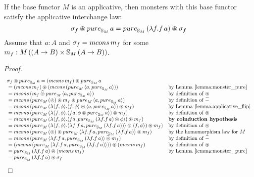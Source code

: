 \begin{lemma}
If the base functor $M$ is an applicative, then monsters with this base functor satisfy the applicative interchange law:
$$
\sigma_f \appl \apure_{\stream{M}}\,a = \apure_{\stream{M}}\,(\lambda f. f\,a) \appl \sigma_f
$$
Assume that $a:A$ and $\sigma_f = \mcons\,m_f$ for some $m_f:M\,((A\rightarrow B)\times \mathbb{S}_{M}\,(A\rightarrow B))$.
\end{lemma}
\begin{proof}
$$
\begin{array}{ll}
\sigma_f \appl \apure_{\stream{M}}\,a = (\mcons\,m_f) \appl \apure_{\stream{M}}\,a \\
{}= (\mcons\,m_f) \appl (\mcons\,(\apure_M\,\langle a, \apure_{\stream{M}}\,a\rangle))
  & \mbox{by Lemma \ref{lemma:monster_pure}}\\
{}= \mcons\,(m_f \alift{\pappl} \apure_M\,\langle a, \apure_{\stream{M}}\,a\rangle)
  & \mbox{by definition of }\appl\\
{}= \mcons\,(\apure_M\,(\pappl) \appl m_f \appl \apure_M\,\langle a, \apure_{\stream{M}}\,a\rangle)
  & \mbox{by definition of }\alift{-}\\
{}= \mcons \, (\apure_M\,(\lambda \pair{f}{\phi} . \pair{f}{\phi} \pappl \pair{a}{\apure_{\stream{M}}\,a}) \appl m_f)
  & \mbox{by Lemma \ref{lemma:applicative_flip}}\\
{}= \mcons\,(\apure_M\,(\lambda \pair{f}{\phi} . \pair{f a}{\phi \appl \apure_{\stream{M}}\,a}) \appl m_f)
  & \mbox{by definition of } \pappl \\
{}= \mcons\,(\apure_M\,(\lambda \pair{f}{\phi} . \pair{f a}{\apure_{\stream{M}}\,(\lambda f . f\, a) \appl \phi}) \appl m_f)
  & \mbox{\bf by coinduction hypothesis} \\
{}= \mcons\,(\apure_M\,(\lambda \pair{f}{\phi}.
    \pair{\lambda f . f\, a}{\apure_{\stream{M}}\,(\lambda f . f\, a))}
    \pappl \pair{f}{\phi}
    ) \appl m_f)
  & \mbox{by definition of } \pappl \\
{}= \mcons\,(\apure_M\,(\pappl) \appl \apure_M\,\langle \lambda f. f\,a, \apure_{\stream{M}}\,(\lambda f. f\,a)  \rangle \appl m_f)
  & \mbox{by the homomorphism law for }M \\
{}= \mcons\,(\apure_M\,\langle \lambda f. f\,a, \apure_{\stream{M}}\,(\lambda f. f\,a)  \rangle \alift{\pappl} m_f)
  & \mbox{by definition of }\alift{-}\\
{}= (\mcons\,(\apure_M\,\langle \lambda f. f\,a, \apure_{\stream{M}}\,(\lambda f. f\,a)  \rangle)) \appl (\mcons\,m_f)
  & \mbox{by definition of }\appl \\
{}= \apure_{\stream{M}}\,(\lambda f. f\,a) \appl (\mcons\,m_f)
  & \mbox{by Lemma \ref{lemma:monster_pure}} \\
{} = \apure_{\stream{M}}\,(\lambda f. f\,a) \appl \sigma_f
\end{array}
$$
\end{proof}


